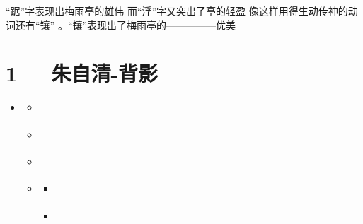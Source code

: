 \documentclass[letterpaper,10pt,english]{sphinxmanual}
\begin{document}
“踞”字表现出梅雨亭的雄伟 而“浮”字又突出了亭的轻盈
像这样用得生动传神的动词还有“镶” 。“镶”表现出了梅雨亭的—————优美


\chapter{1   朱自清-背影}
\label{\detokenize{p01_u6563_u6587/_u6731_u81ea_u6e05-_u80cc_u5f71:id1}}\label{\detokenize{p01_u6563_u6587/_u6731_u81ea_u6e05-_u80cc_u5f71::doc}}
\begin{sphinxShadowBox}
\begin{itemize}
\item {} 
\label{\detokenize{p01_u6563_u6587/_u6731_u81ea_u6e05-_u80cc_u5f71:id14}}{\hyperref[\detokenize{p01_u6563_u6587/_u6731_u81ea_u6e05-_u80cc_u5f71:id1}]{}}
\begin{itemize}
\item {} 
\label{\detokenize{p01_u6563_u6587/_u6731_u81ea_u6e05-_u80cc_u5f71:id15}}{\hyperref[\detokenize{p01_u6563_u6587/_u6731_u81ea_u6e05-_u80cc_u5f71:id3}]{}}

\item {} 
\label{\detokenize{p01_u6563_u6587/_u6731_u81ea_u6e05-_u80cc_u5f71:id16}}{\hyperref[\detokenize{p01_u6563_u6587/_u6731_u81ea_u6e05-_u80cc_u5f71:id4}]{}}

\item {} 
\label{\detokenize{p01_u6563_u6587/_u6731_u81ea_u6e05-_u80cc_u5f71:id17}}{\hyperref[\detokenize{p01_u6563_u6587/_u6731_u81ea_u6e05-_u80cc_u5f71:id5}]{}}

\item {} 
\label{\detokenize{p01_u6563_u6587/_u6731_u81ea_u6e05-_u80cc_u5f71:id18}}{\hyperref[\detokenize{p01_u6563_u6587/_u6731_u81ea_u6e05-_u80cc_u5f71:id6}]{}}
\begin{itemize}
\item {} 
\label{\detokenize{p01_u6563_u6587/_u6731_u81ea_u6e05-_u80cc_u5f71:id19}}{\hyperref[\detokenize{p01_u6563_u6587/_u6731_u81ea_u6e05-_u80cc_u5f71:id7}]{}}

\item {} 
\label{\detokenize{p01_u6563_u6587/_u6731_u81ea_u6e05-_u80cc_u5f71:id20}}{\hyperref[\detokenize{p01_u6563_u6587/_u6731_u81ea_u6e05-_u80cc_u5f71:id8}]{}}


\end{itemize}
\end{itemize}
\end{itemize}
\end{sphinxShadowBox}
\end{document}
